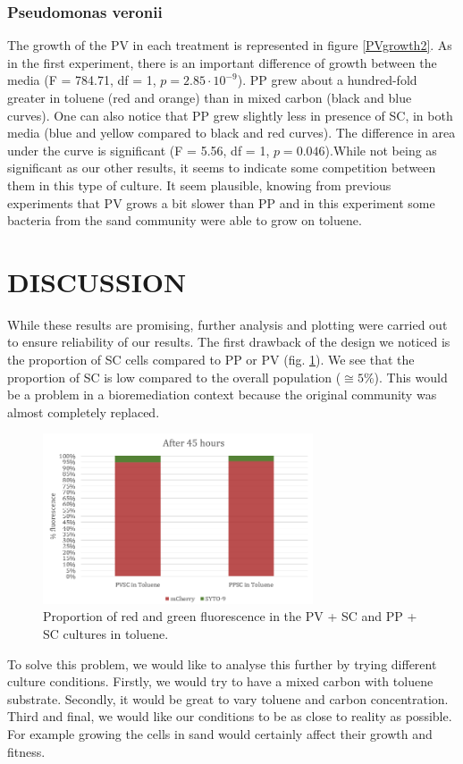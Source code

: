 \documentclass[a4paper, 10pt, conference]{ieeeconf}   %
\begin{document}
\subsubsection{Pseudomonas veronii}
The growth of the PV in each treatment is represented in figure \ref{PVgrowth2}.
As in the first experiment, there is an important difference of growth between the media (F = 784.71, df = 1, $p = 2.85 \cdot 10^{-9}$). PP grew about a hundred-fold greater in toluene (red and orange) than in mixed carbon (black and blue curves).
One can also notice that PP grew slightly less in presence of SC, in both media (blue and yellow compared to black and red curves). The difference in area under the curve is significant (F = 5.56, df = 1, $p = 0.046$).While not being as significant as our other results, it seems to indicate some competition between them in this type of culture. It seem plausible, knowing from previous experiments that PV grows a bit slower than PP and in this experiment some bacteria from the sand community were able to grow on toluene.
\newline

\section{DISCUSSION}
While these results are promising, further analysis and plotting were carried out to ensure reliability of our results. 
The first drawback of the design we noticed is the proportion of SC cells compared to PP or PV  (fig. \ref{barplot}). We see that the proportion of SC is low compared to the overall population ($\cong 5\%$). This would be a problem in a bioremediation context because the original community was almost completely replaced.


\begin{figure}
	\centering
	 
	\includegraphics[width=8cm]{problem_barplot.PNG}
	\caption{Proportion of red and green fluorescence in the PV + SC and PP + SC cultures in toluene.}
	\label{barplot}
	  
\end{figure}
To solve this problem, we would like to analyse this further by trying different culture conditions. Firstly, we would try to have a mixed carbon with toluene substrate. Secondly, it would be great to vary toluene and carbon concentration. Third and final, we would like our conditions to be as close to reality as possible. For example growing the cells in sand would certainly affect their growth and fitness.
\end{document}
